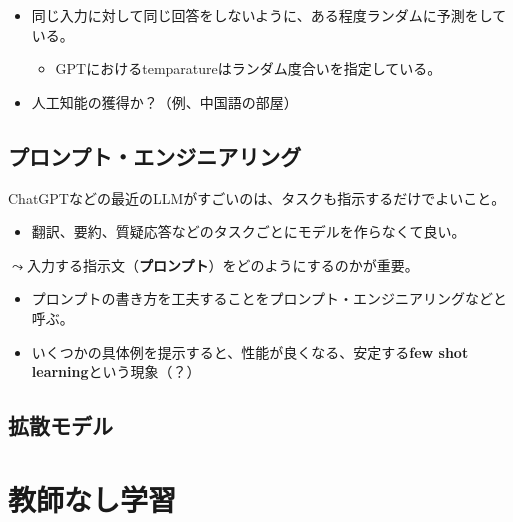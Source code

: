 \documentclass[
  xelatex,
  ja=standard]{bxjsarticle}
\providecommand{\tightlist}{%
  \setlength{\itemsep}{0pt}\setlength{\parskip}{0pt}}\usepackage{longtable,booktabs,array}
\begin{document}
\begin{itemize}
\tightlist
\item
  同じ入力に対して同じ回答をしないように、ある程度ランダムに予測をしている。

  \begin{itemize}
  \tightlist
  \item
    GPTにおけるtemparatureはランダム度合いを指定している。
  \end{itemize}
\item
  人工知能の獲得か？（例、中国語の部屋）
\end{itemize}

\hypertarget{ux30d7ux30edux30f3ux30d7ux30c8ux30a8ux30f3ux30b8ux30cbux30a2ux30eaux30f3ux30b0}{%
\subsection{プロンプト・エンジニアリング}\label{ux30d7ux30edux30f3ux30d7ux30c8ux30a8ux30f3ux30b8ux30cbux30a2ux30eaux30f3ux30b0}}

ChatGPTなどの最近のLLMがすごいのは、タスクも指示するだけでよいこと。

\begin{itemize}
\tightlist
\item
  翻訳、要約、質疑応答などのタスクごとにモデルを作らなくて良い。
\end{itemize}

\(\leadsto\)入力する指示文（\textbf{プロンプト}）をどのようにするのかが重要。

\begin{itemize}
\tightlist
\item
  プロンプトの書き方を工夫することをプロンプト・エンジニアリングなどと呼ぶ。
\item
  いくつかの具体例を提示すると、性能が良くなる、安定する\textbf{few shot
  learning}という現象（？）
\end{itemize}

\hypertarget{ux62e1ux6563ux30e2ux30c7ux30eb}{%
\subsection{拡散モデル}\label{ux62e1ux6563ux30e2ux30c7ux30eb}}

\hypertarget{ux6559ux5e2bux306aux3057ux5b66ux7fd2}{%
\section{教師なし学習}\label{ux6559ux5e2bux306aux3057ux5b66ux7fd2}}
\end{document}
